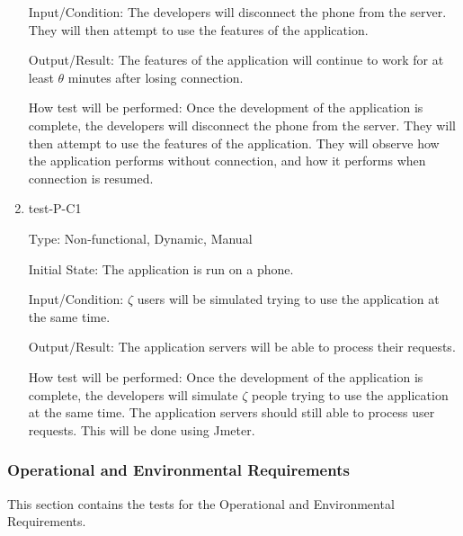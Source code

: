 \documentclass[12pt, titlepage]{article}
\begin{document}
\begin{enumerate}
Input/Condition: The developers will disconnect the phone from the server. They will then attempt to use the features of the application.
					
Output/Result: The features of the application will continue to work for at least $\theta$ minutes after losing connection.
					
How test will be performed: Once the development of the application is complete, the developers will disconnect the phone from the server. They will then attempt to use the features of the application. They will observe how the application performs without connection, and how it performs when connection is resumed.

\item{test-P-C1\\}

Type: Non-functional, Dynamic, Manual 
					
Initial State: The application is run on a phone.
					
Input/Condition: $\zeta$ users will be simulated trying to use the application at the same time.
					
Output/Result: The application servers will be able to process their requests.
					
How test will be performed: Once the development of the application is complete, the developers will simulate $\zeta$ people trying to use the application at the same time. The application servers should still able to process user requests. This will be done using Jmeter.


\end{enumerate}

\subsubsection{Operational and Environmental Requirements}

This section contains the tests for the Operational and Environmental Requirements.
		
\end{document}
